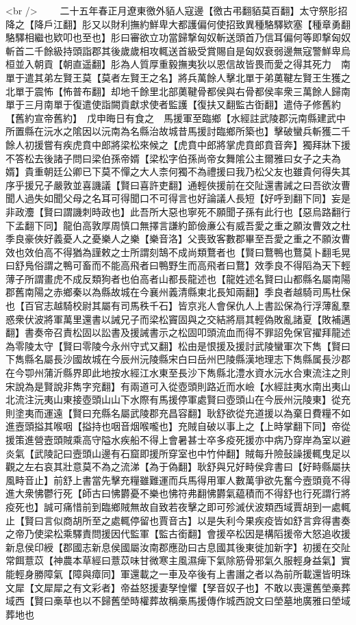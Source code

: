 <br />
　　二十五年春正月遼東徼外貊人寇邊【徼古弔翻貊莫百翻】太守祭肜招降之【降戶江翻】肜又以財利撫約鮮卑大都護偏何使招致異種駱驛欵塞【種章勇翻駱驛相繼也欵叩也至也】肜曰審欲立功當歸撃匈奴斬送頭首乃信耳偏何等即撃匈奴斬首二千餘級持頭詣郡其後歲歲相攻輒送首級受賞賜自是匈奴衰弱邊無寇警鮮卑烏桓並入朝貢【朝直遥翻】肜為人質厚重毅撫夷狄以恩信故皆畏而愛之得其死力　南單于遣其弟左賢王莫【莫者左賢王之名】將兵萬餘人擊北單于弟薁鞬左賢王生獲之北單于震怖【怖普布翻】却地千餘里北部薁鞬骨都侯與右骨都侯率衆三萬餘人歸南單于三月南單于復遣使詣闕貢獻求使者監護【復扶又翻監古衘翻】遣侍子修舊約【舊約宣帝舊約】　戊申晦日有食之　馬援軍至臨鄉【水經註武陵郡沅南縣建武中所置縣在沅水之隂因以沅南為名縣治故城昔馬援討臨鄉所築也】擊破蠻兵斬獲二千餘人初援嘗有疾虎賁中郎將梁松來候之【虎賁中郎將掌虎賁郎賁音奔】獨拜牀下援不答松去後諸子問曰梁伯孫帝婿【梁松字伯孫尚帝女舞隂公主爾雅曰女子之夫為婿】貴重朝廷公卿已下莫不憚之大人柰何獨不為禮援曰我乃松父友也雖貴何得失其序乎援兄子嚴敦並喜譏議【賢曰喜許吏翻】通輕俠援前在交阯還書誡之曰吾欲汝曹聞人過失如聞父母之名耳可得聞口不可得言也好論議人長短【好呼到翻下同】妄是非政灋【賢曰謂譏刺時政也】此吾所大惡也寧死不願聞子孫有此行也【惡烏路翻行下孟翻下同】龍伯高敦厚周慎口無擇言謙約節儉亷公有威吾愛之重之願汝曹效之杜季良豪俠好義憂人之憂樂人之樂【樂音洛】父喪致客數郡畢至吾愛之重之不願汝曹效也效伯高不得猶為謹敕之士所謂刻鵠不成尚類鶩者也【賢曰鶩鴨也鶩莫卜翻毛晃曰舒鳬俗謂之鴨可畜而不能高飛者曰鴨野生而高飛者曰鶩】效季良不得䧟為天下輕薄子所謂畫虎不成反類狗者也伯高者山都長龍述也【龍姓述名賢曰山都縣名屬南陽郡舊南陽之赤鄉秦以為縣故城在今襄州義清縣東北長知兩翻】季良者越騎司馬杜保也【百官志越騎校尉其屬有司馬秩千石】皆京兆人會保仇人上書訟保為行浮薄亂羣惑衆伏波將軍萬里還書以誡兄子而梁松竇固與之交結將扇其輕偽敗亂諸夏【敗補邁翻】書奏帝召責松固以訟書及援誡書示之松固叩頭流血而得不罪詔免保官擢拜龍述為零陵太守【賢曰零陵今永州守式又翻】松由是恨援及援討武陵蠻軍次下雋【賢曰下雋縣名屬長沙國故城在今辰州沅陵縣宋白曰岳州巴陵縣漢地理志下雋縣属長沙郡在今卾州蒲沂縣界即此地按水經江水東至長沙下雋縣北澧水資水沅水合東流注之則宋說為是賢說非雋字兖翻】有兩道可入從壺頭則路近而水嶮【水經註夷水南出夷山北流注沅夷山東接壺頭山山下水際有馬援停軍處賢曰壺頭山在今辰州沅陵東】從充則塗夷而運遠【賢曰充縣名屬武陵郡充昌容翻】耿舒欲從充道援以為棄日費糧不如進壼頭搤其喉咽【搤持也咽音烟喉嚨也】充賊自破以事上之【上時掌翻下同】帝從援策進營壼頭賊乘高守隘水疾船不得上會暑甚士卒多疫死援亦中病乃穿岸為室以避炎氣【武陵記曰壼頭山邊有石窟即援所穿室也中竹仲翻】賊每升險鼔譟援輒曳足以觀之左右哀其壯意莫不為之流涕【為于偽翻】耿舒與兄好畤侯弇書曰【好畤縣屬扶風畤音止】前舒上書當先擊充糧雖難運而兵馬得用軍人數萬爭欲先奮今壼頭竟不得進大衆怫鬱行死【師古曰怫欝憂不樂也怫符弗翻怫欝氣藴積而不得舒也行死謂行將疫死也】誠可痛惜前到臨鄉賊無故自致若夜擊之即可殄滅伏波類西域賈胡到一處輒止【賢曰言似商胡所至之處輒停留也賈音古】以是失利今果疾疫皆如舒言弇得書奏之帝乃使梁松乘驛責問援因代監軍【監古銜翻】會援卒松因是構䧟援帝大怒追收援新息侯印綬【郡國志新息侯國屬汝南郡應劭曰古息國其後東徙加新字】初援在交阯常餌薏苡【神農本草經曰薏苡味甘微寒主風濕痺下氣除筋骨邪氣久服輕身益氣】實能輕身勝障氣【障與瘴同】軍還載之一車及卒後有上書譖之者以為前所載還皆明珠文犀【文犀犀之有文彩者】帝益怒援妻孥惶懼【孥音奴子也】不敢以喪還舊塋槀葬域西【賢曰槀草也以不歸舊塋時權葬故稱槀馬援傳作城西說文曰塋墓地廣雅曰塋域葬地也